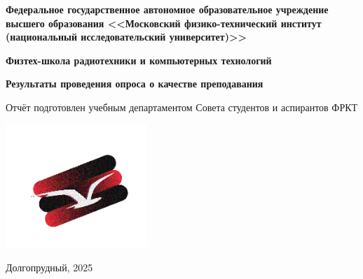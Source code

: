 \begin{titlepage}
	\clearpage\thispagestyle{empty}
	\centering
	
	\textbf{Федеральное государственное автономное образовательное учреждение высшего образования <<Московский физико-технический институт (национальный исследовательский университет)>>}
    
    \vspace{1ex}
    
   \textbf{Физтех-школа радиотехники и компьютерных технологий}
	\vspace{30ex}
	
	\LARGE{{\textbf{Результаты проведения опроса о качестве преподавания}}}
	
	\vspace{1ex}
	

    \large{Отчёт подготовлен учебным департаментом Совета студентов и аспирантов ФРКТ}

	\includegraphics[width=0.4\textwidth]{images/logo.png}
	
	\vfill
	Долгопрудный, 2025
	\pagebreak
\end{titlepage}